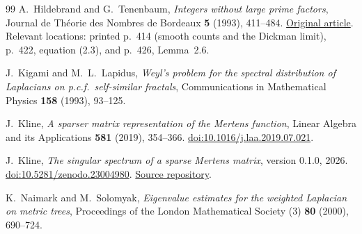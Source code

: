 \begin{thebibliography}{99}
A.~Hildebrand and G.~Tenenbaum,
\emph{Integers without large prime factors},
Journal de Th\'eorie des Nombres de Bordeaux \textbf{5} (1993), 411--484.
\href{https://numdam.org/item/JTNB_1993__5_2_411_0.pdf}{Original article}.
Relevant locations: printed p.~414 (smooth counts and the Dickman limit),
p.~422, equation (2.3), and p.~426, Lemma~2.6.

J.~Kigami and M.~L.~Lapidus,
\emph{Weyl's problem for the spectral distribution of Laplacians on
p.c.f.\ self-similar fractals},
Communications in Mathematical Physics \textbf{158} (1993), 93--125.

J.~Kline, \emph{A sparser matrix representation of the Mertens function},
Linear Algebra and its Applications \textbf{581} (2019), 354--366.
\href{https://doi.org/10.1016/j.laa.2019.07.021}{doi:10.1016/j.laa.2019.07.021}.

J.~Kline,
\emph{The singular spectrum of a sparse Mertens matrix},
version 0.1.0, 2026.
\href{https://doi.org/10.5281/zenodo.23004980}{doi:10.5281/zenodo.23004980}.
\href{https://github.com/jeff-kline/sparse-mertens-singular-spectrum}{Source repository}.

K.~Naimark and M.~Solomyak,
\emph{Eigenvalue estimates for the weighted Laplacian on metric trees},
Proceedings of the London Mathematical Society (3) \textbf{80} (2000),
690--724.
\end{thebibliography}

